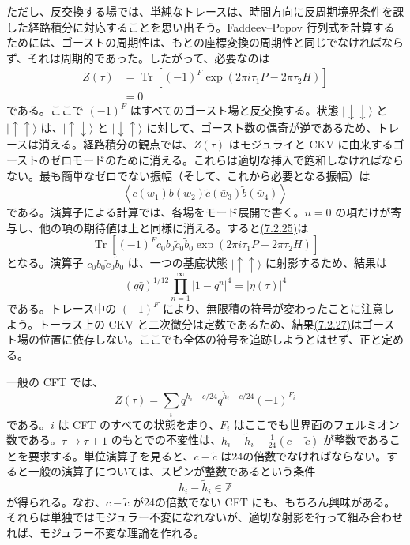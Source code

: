ただし、反交換する場では、単純なトレースは、時間方向に反周期境界条件を課した経路積分に対応することを思い出そう。Faddeev--Popov 行列式を計算するためには、ゴーストの周期性は、もとの座標変換の周期性と同じでなければならず、それは周期的であった。したがって、必要なのは
\begin{equation}
\begin{aligned}
Z(\tau)&=\operatorname{Tr}[(-1)^F\exp(2\pi i\tau_1P-2\pi\tau_2H)]\\
&=0
\end{aligned}
\tag{7.2.24}\label{eq:7.2.24}
\end{equation}
である。ここで $(-1)^F$ はすべてのゴースト場と反交換する。状態 $\lvert\downarrow\downarrow\rangle$ と $\lvert\uparrow\uparrow\rangle$ は、$\lvert\uparrow\downarrow\rangle$ と $\lvert\downarrow\uparrow\rangle$ に対して、ゴースト数の偶奇が逆であるため、トレースは消える。経路積分の観点では、$Z(\tau)$ はモジュライと CKV に由来するゴーストのゼロモードのために消える。これらは適切な挿入で飽和しなければならない。最も簡単なゼロでない振幅（そして、これから必要となる振幅）は
\begin{equation}
\left\langle c(w_1)b(w_2)\tilde c(\bar w_3)\tilde b(\bar w_4)\right\rangle
\tag{7.2.25}\label{eq:7.2.25}
\end{equation}
である。演算子による計算では、各場をモード展開で書く。$n=0$ の項だけが寄与し、他の項の期待値は上と同様に消える。すると\hyperref[eq:7.2.25]{(7.2.25)}は
\begin{equation}
\operatorname{Tr}\left[
(-1)^Fc_0b_0\tilde c_0\tilde b_0
\exp(2\pi i\tau_1P-2\pi\tau_2H)\right]
\tag{7.2.26}\label{eq:7.2.26}
\end{equation}
となる。演算子 $c_0b_0\tilde c_0\tilde b_0$ は、一つの基底状態 $\lvert\uparrow\uparrow\rangle$ に射影するため、結果は
\begin{equation}
(q\bar q)^{1/12}\prod_{n=1}^{\infty}|1-q^n|^4=|\eta(\tau)|^4
\tag{7.2.27}\label{eq:7.2.27}
\end{equation}
である。トレース中の $(-1)^F$ により、無限積の符号が変わったことに注意しよう。トーラス上の CKV と二次微分は定数であるため、結果\hyperref[eq:7.2.27]{(7.2.27)}はゴースト場の位置に依存しない。ここでも全体の符号を追跡しようとはせず、正と定める。


一般の CFT では、
\begin{equation}
Z(\tau)=\sum_iq^{h_i-c/24}\bar q^{\tilde h_i-\tilde c/24}(-1)^{F_i}
\tag{7.2.28}\label{eq:7.2.28}
\end{equation}
である。$i$ は CFT のすべての状態を走り、$F_i$ はここでも世界面のフェルミオン数である。$\tau\to\tau+1$ のもとでの不変性は、$h_i-\tilde h_i-\tfrac1{24}(c-\tilde c)$ が整数であることを要求する。単位演算子を見ると、$c-\tilde c$ は24の倍数でなければならない。すると一般の演算子については、スピンが整数であるという条件
\begin{equation}
h_i-\tilde h_i\in\mathbb Z
\tag{7.2.29}\label{eq:7.2.29}
\end{equation}
が得られる。なお、$c-\tilde c$ が24の倍数でない CFT にも、もちろん興味がある。それらは単独ではモジュラー不変になれないが、適切な射影を行って組み合わせれば、モジュラー不変な理論を作れる。


